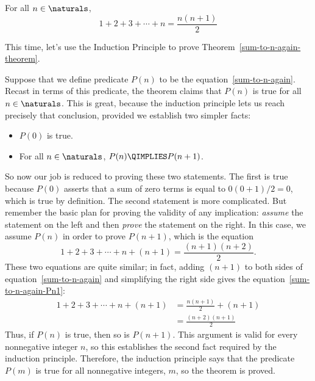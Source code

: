\begin{theorem}\label{sum-to-n-again-theorem}
For all $n \in \naturals$,
\begin{equation}\label{sum-to-n-again}
1 + 2 + 3 + \cdots + n = \frac{n(n+1)}{2}
\end{equation}
\end{theorem}

This time, let's use the Induction Principle to prove
Theorem~\ref{sum-to-n-again-theorem}.

Suppose that we define predicate $P(n)$ to be the
equation~\eqref{sum-to-n-again}.  Recast in terms of this predicate, the
theorem claims that $P(n)$ is true for all $n \in \naturals$.  This is
great, because the induction principle lets us reach precisely that
conclusion, provided we establish two simpler facts:
%
\begin{itemize}
\item $P(0)$ is true.
\item For all $n \in \naturals$, $P(n) \QIMPLIES P(n+1)$.
\end{itemize}

So now our job is reduced to proving these two statements.  The first
is true because $P(0)$ asserts that a sum of zero terms is equal to
$0(0+1)/2 = 0$, which is true by definition.
%
The second statement is more complicated.  But remember the basic plan for
proving the validity of any implication: \emph{assume} the statement on
the left and then \emph{prove} the statement on the right.  In this
case, we assume $P(n)$ in order to prove $P(n+1)$, which is the equation
\begin{equation}\label{sum-to-n-again-Pn1}
1 + 2 + 3 + \cdots + n + (n+1) = \frac{(n+1)(n+2)}{2}.
\end{equation}
These two equations are quite similar; in fact, adding $(n+1)$ to both
sides of equation~\eqref{sum-to-n-again} and simplifying the right side 
gives the equation~\eqref{sum-to-n-again-Pn1}:
\begin{align*}
1 + 2 + 3 + \cdots + n + (n+1)
    & = \frac{n(n+1)}{2} + (n+1) \\
    & = \frac{(n+2)(n+1)}{2}
\end{align*}
Thus, if $P(n)$ is true, then so is $P(n+1)$.  This argument is valid for
every nonnegative integer $n$, so this establishes the second fact
required by the induction principle.  Therefore, the induction principle
says that the predicate $P(m)$ is true for all nonnegative integers, $m$,
so the theorem is proved.

